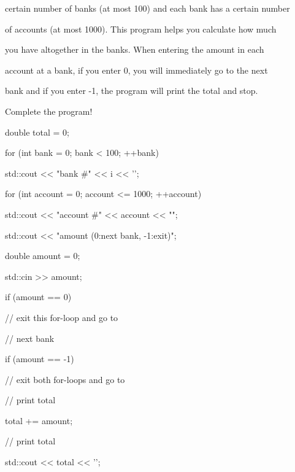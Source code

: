 certain number of banks (at most 100) and each bank has a certain number

of accounts (at most 1000). This program helps you calculate how much

you have altogether in the banks. When entering the amount in each

account at a bank, if you enter 0, you will immediately go to the next

bank and if you enter -1, the program will print the total and stop.

Complete the program!



\begin{console}

double total = 0;

for (int bank = 0; bank < 100; ++bank)

{   

    std::cout << "bank #" << i << '\n';

    for (int account = 0; account <= 1000; ++account)

    {   

        std::cout << "account #" << account << "\n";

        std::cout << "amount (0:next bank, -1:exit)";

        double amount = 0;

        std::cin >> amount;

        if (amount == 0)

        {  

           // exit this for-loop and go to

           // next bank

        }

        if (amount == -1)

        {  

           // exit both for-loops and go to

           // print total

        }

        total += amount;

     }

}



// print total

std::cout << total << '\n'; 

\end{console}

